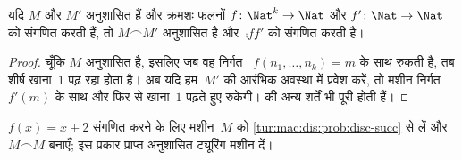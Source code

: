\documentclass[../../../include/open-logic-section]{subfiles}
\begin{document}
\begin{prop}
    यदि $M$ और $M'$ अनुशासित हैं और क्रमशः फलनों $f\colon
    \Nat^k \to \Nat$ और $f'\colon \Nat \to \Nat$ को संगणित करती हैं,
    तो $M \frown M'$ अनुशासित है और~$\comp{f}{f'}$ को संगणित करती है।
\end{prop}

\begin{proof}
    चूँकि $M$ अनुशासित है, इसलिए जब वह निर्गत
    ~$f(n_1,\dots,n_k) = m$ के साथ रुकती है, तब शीर्ष खाना~$1$ पढ़ रहा
    होता है। अब यदि हम~$M'$ की आरंभिक अवस्था में प्रवेश करें, तो मशीन
    निर्गत $f'(m)$ के साथ और फिर से खाना~$1$ पढ़ते हुए रुकेगी।
     की अन्य शर्तें भी पूरी होती हैं।
\end{proof}

\begin{prob}
    $f(x) = x+2$ संगणित करने के लिए मशीन~$M$ को
    \cref{tur:mac:dis:prob:disc-succ} से लें और $M \frown M$ बनाएँ; इस
    प्रकार प्राप्त अनुशासित ट्यूरिंग मशीन दें।
\end{prob}
\end{document}
